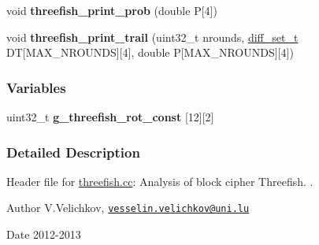 \begin{DoxyCompactItemize}
\item 
\hypertarget{threefish_8hh_adc16c924074a99d81f1e2ddb66b9b358}{void {\bfseries threefish\-\_\-print\-\_\-prob} (double \-P\mbox{[}4\mbox{]})}\label{threefish_8hh_adc16c924074a99d81f1e2ddb66b9b358}

\item 
\hypertarget{threefish_8hh_a6c6a0ddf7a277dcec8ce70edd37dcbfc}{void {\bfseries threefish\-\_\-print\-\_\-trail} (uint32\-\_\-t nrounds, \hyperlink{structdiff__set__t}{diff\-\_\-set\-\_\-t} \-D\-T\mbox{[}\-M\-A\-X\-\_\-\-N\-R\-O\-U\-N\-D\-S\mbox{]}\mbox{[}4\mbox{]}, double \-P\mbox{[}\-M\-A\-X\-\_\-\-N\-R\-O\-U\-N\-D\-S\mbox{]}\mbox{[}4\mbox{]})}\label{threefish_8hh_a6c6a0ddf7a277dcec8ce70edd37dcbfc}

\end{DoxyCompactItemize}
\subsubsection*{\-Variables}
\begin{DoxyCompactItemize}
\item 
\hypertarget{threefish_8hh_af5f38cdfeae1c7771dd05d4fafe42685}{uint32\-\_\-t {\bfseries g\-\_\-threefish\-\_\-rot\-\_\-const} \mbox{[}12\mbox{]}\mbox{[}2\mbox{]}}\label{threefish_8hh_af5f38cdfeae1c7771dd05d4fafe42685}

\end{DoxyCompactItemize}


\subsubsection{\-Detailed \-Description}
\-Header file for \hyperlink{threefish_8cc}{threefish.\-cc}\-: \-Analysis of block cipher \-Threefish. . \begin{DoxyAuthor}{\-Author}
\-V.\-Velichkov, \href{mailto:vesselin.velichkov@uni.lu}{\tt vesselin.\-velichkov@uni.\-lu} 
\end{DoxyAuthor}
\begin{DoxyDate}{\-Date}
2012-\/2013 
\end{DoxyDate}


